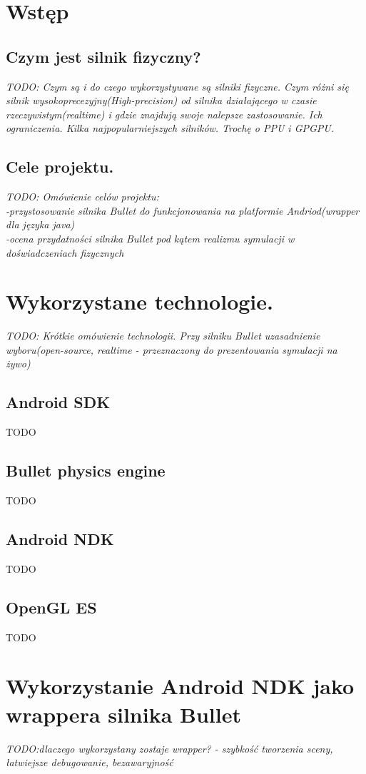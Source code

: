   \section{Wstęp}\label{sec:wstep}
  \subsection{Czym jest silnik fizyczny?}\label{subsec:czymJestSilnik}
\emph{TODO: Czym są i do czego wykorzystywane są silniki fizyczne. Czym różni
się silnik wysokoprecezyjny(High-precision) od silnika działającego w czasie
rzeczywistym(realtime) i gdzie znajdują swoje nalepsze zastosowanie. Ich
ograniczenia. Kilka najpopularniejszych silników. Trochę o PPU i GPGPU.}
  \subsection{Cele projektu.}\label{subsec:celeProjektu}
  \emph{TODO: Omówienie celów projektu:\\
  -przystosowanie silnika Bullet do funkcjonowania na platformie
  Andriod(wrapper dla języka java)\\
  -ocena przydatności silnika Bullet pod kątem realizmu symulacji w
  doświadczeniach fizycznych}
  \newpage
  \section{Wykorzystane technologie.}
  \emph{TODO: Krótkie omówienie technologii. Przy silniku Bullet uzasadnienie
  wyboru(open-source, realtime - przeznaczony do prezentowania symulacji na
  żywo)}
  \subsection{Android SDK}
TODO
  \subsection{Bullet physics engine}
TODO
  \subsection{Android NDK}
TODO
\subsection{OpenGL ES}
TODO
  \newpage
  \section{Wykorzystanie Android NDK jako wrappera silnika Bullet}
  \emph{TODO:dlaczego wykorzystany zostaje wrapper? - szybkość tworzenia sceny,
  łatwiejsze debugowanie, bezawaryjność}
